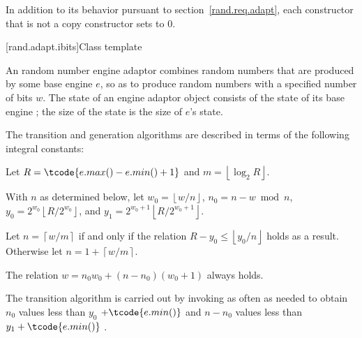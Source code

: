 \pnum
In addition to its behavior
pursuant to section~\ref{rand.req.adapt},
each constructor%
that is not a copy constructor
sets  to $0$.


[rand.adapt.ibits]{Class template }%
%

\pnum
An 
random number engine adaptor
combines random numbers
that are produced by some base engine $e$,
so as to produce random numbers
with a specified number of bits $w$.
The state%
%
of an 
engine adaptor object 
consists of
 the state  of its base engine ;
the size of the state is
 the size of $e$'s state.

\pnum
The transition and generation algorithms
are described in terms
of the following integral constants:%
\begin{enumeratea}
 \item
   Let
     $ R = \tcode{e.max() - e.min() + 1} $
   and
     $ m = \left\lfloor \log_2 R \right\rfloor $.
 \item
   With $n$ as determined below,
   let
     $ w_0 = \left\lfloor w / n \right\rfloor $,
     $ n_0 = n - w \bmod n $,
     $ y_0 = 2^{w_0} \left\lfloor R / 2^{w_0} \right\rfloor $,
   and
     $ y_1 = 2^{w_0 + 1} \left\lfloor R / 2^{w_0 + 1} \right\rfloor $.
 \item
   Let
     $ n = \left\lceil w / m \right\rceil $
   if and only if the relation
     $ R - y_0 \leq \left\lfloor y_0 / n \right\rfloor $
   holds as a result.
   Otherwise let
     $ n = 1 + \left\lceil w / m \right\rceil $.
\end{enumeratea}
\begin{note}
 The relation
 $ w = n_0 w_0 + (n - n_0)(w_0 + 1) $
 always holds.
\end{note}

\pnum
The transition algorithm%
%
is carried out
by invoking 
as often as needed
to obtain
 $ n_0 $
values less than
$ y_0 $ $ + \tcode{e.min()} $
and
 $ n - n_0 $
values less than $ y_1 + \tcode{e.min()} $%
.

